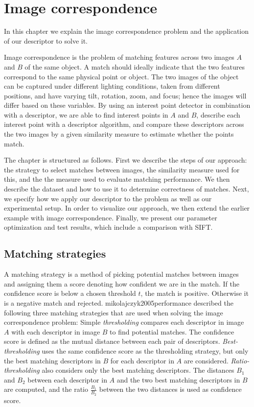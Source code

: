 \documentclass[thesis.tex]{subfiles}
\begin{document}
\chapter{Image correspondence}
\label{sec:ic}
%
In this chapter we explain the image correspondence problem and the application of our descriptor to solve it.

Image correspondence is the problem of matching features across two images $A$ and $B$ of the same object. A match should ideally indicate that the two features correspond to the same physical point or object. The two images of the object can be captured under different lighting conditions, taken from different positions, and have varying tilt, rotation, zoom, and focus; hence the images will differ based on these variables. By using an interest point detector in combination with a descriptor, we are able to find interest points in $A$ and $B$, describe each interest point with a descriptor algorithm, and compare these descriptors across the two images by a given similarity measure to estimate whether the points match.

The chapter is structured as follows. First we describe the steps of our approach: the strategy to select matches between images, the similarity measure used for this, and the the measure used to evaluate matching performance. We then describe the dataset and how to use it to determine correctness of matches. Next, we specify how we apply our descriptor to the problem as well as our experimental setup. In order to visualize our approach, we then extend the earlier example with image correspondence. Finally, we present our parameter optimization and test results, which include a comparison with SIFT.
%
\section{Matching strategies}
\label{sec:matching_strategies}
%
A matching strategy is a method of picking potential matches between images and assigning them a score denoting how confident we are in the match. If the confidence score is below a chosen threshold $t$, the match is positive. Otherwise it is a negative match and rejected.
{mikolajczyk2005performance} described the following three matching strategies that are used when solving the image correspondence problem:
Simple \emph{thresholding} compares each descriptor in image $A$ with each descriptor in image $B$ to find potential matches. The confidence score is defined as the mutual distance between each pair of descriptors. \emph{Best-thresholding} uses the same confidence score as the thresholding strategy, but only the best matching descriptors in $B$ for each descriptor in $A$ are considered. \emph{Ratio-thresholding} also considers only the best matching descriptors. The distances $B_1$ and $B_2$ between each descriptor in $A$ and the two best matching descriptors in $B$ are computed, and the ratio $\frac{B_1}{B_2}$ between the two distances is used as confidence score.
\end{document}
